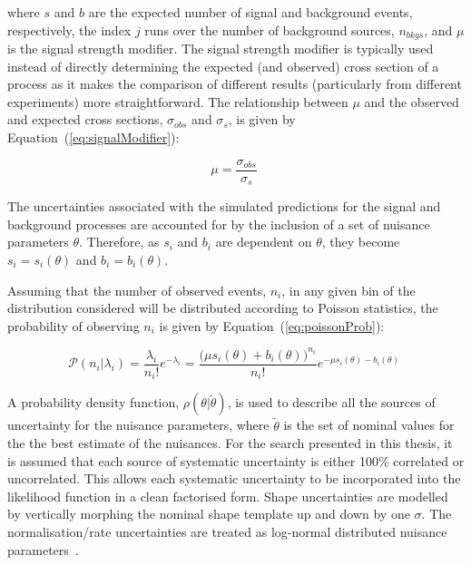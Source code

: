 where $s$ and $b$ are the expected number of signal and background events, respectively, the index $j$ runs over the number of background sources, $n_{bkgs}$, and $\mu$ is the signal strength modifier.
The signal strength modifier is typically used instead of directly determining the expected (and observed) cross section of a process as it makes the comparison of different results (particularly from different experiments) more straightforward. 
The relationship between $\mu$ and the observed and expected cross sections, $\sigma_{obs}$ and $\sigma_{s}$, is given by Equation~(\ref{eq:signalModifier}):

\begin{equation}
\mu = \frac{\sigma_{obs}}{\sigma_{s}}  \;
\label{eq:signalModifier}
\end{equation}
 
The uncertainties associated with the simulated predictions for the signal and background processes are accounted for by the inclusion of a set of nuisance parameters $\theta$.
Therefore, as $s_{i}$ and $b_{i}$ are dependent on $\theta$, they become $s_{i} = s_{i} (\theta)$ and $b_{i} = b_{i} (\theta)$.

Assuming that the number of observed events, $n_{i}$, in any given bin of the distribution considered will be distributed according to Poisson statistics, the probability of observing $n_{i}$ is given by Equation~(\ref{eq:poissonProb}):

\begin{equation}
\mathcal{P} ( n_{i} | \lambda_{i} ) = \frac{\lambda_{i}}{n_{i}!} e^{- \lambda_{i}} = \frac{ \big( \mu s_{i}(\theta) + b_{i}(\theta) \big)^{n_{i}}}{n_{i} !} e^{- \mu s_{i}(\theta) - b_{i}(\theta)}  \;
\label{eq:poissonProb}
\end{equation}

A probability density function, $\rho ( \theta | \tilde{\theta} )$, is used to describe all the sources of uncertainty for the nuisance parameters, where $\tilde{\theta}$ is the set of nominal values for the the best estimate of the nuisances.
For the search presented in this thesis, it is assumed that each source of systematic uncertainty is either 100\% correlated or uncorrelated.
This allows each systematic uncertainty to be incorporated into the likelihood function in a clean factorised form.
Shape uncertainties are modelled by vertically morphing the nominal shape template up and down by one $\sigma$.
The normalisation/rate uncertainties are treated as log-normal distributed nuisance parameters~\cite{AsymptoticFormulae,Baak:2014fta}.

